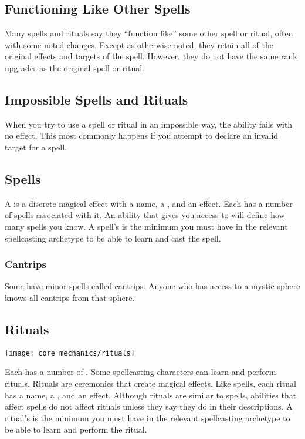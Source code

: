     \subsection{Functioning Like Other Spells}\label{Functioning Like Other Spells}
        Many spells and rituals say they ``function like'' some other spell or ritual, often with some noted changes.
        Except as otherwise noted, they retain all of the original effects and targets of the spell.
        However, they do not have the same rank upgrades as the original spell or ritual.

    \subsection{Impossible Spells and Rituals}
        When you try to use a spell or ritual in an impossible way, the ability fails with no effect.
        This most commonly happens if you attempt to declare an invalid target for a spell.

    \subsection{Spells}\label{Spells}
        A  is a discrete magical effect with a name, a , and an effect.
        Each  has a number of spells associated with it.
        An ability that gives you access to  will define how many spells you know.
        A spell's  is the minimum  you must have in the relevant spellcasting archetype to be able to learn and cast the spell.

        \subsubsection{Cantrips}\label{Cantrips}
            Some  have minor spells called cantrips.
            Anyone who has access to a mystic sphere knows all cantrips from that sphere.

    \subsection{Rituals}\label{Rituals}
        \texttt{[image: core mechanics/rituals]}

        Each  has a number of .
        Some spellcasting characters can learn and perform rituals.
        Rituals are ceremonies that create magical effects.
        Like spells, each ritual has a name, a , and an effect.
        Although rituals are similar to spells, abilities that affect spells do not affect rituals unless they say they do in their descriptions.
        A ritual's  is the minimum  you must have in the relevant spellcasting archetype to be able to learn and perform the ritual.

